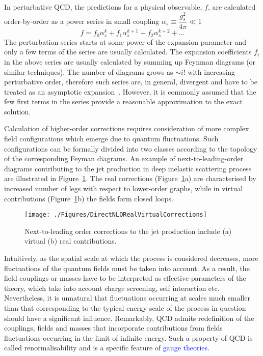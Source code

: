 In perturbative QCD, the predictions for a physical observable, $f$, are calculated order-by-order as a power series in small coupling $\alpha_s \equiv \dfrac{g_s^2}{4\pi} \ll 1$
\begin{equation}
   f=f_{0}\alpha^{k}_s + f_{1}\alpha^{k+1}_s + f_{2}\alpha^{k+2}_s + \ldots
	 \label{eq:pertseries}
\end{equation}
The perturbation series starts at some power of the expansion parameter and only a few terms of the series are usually calculated. The expansion coefficients $f_i$ in the above series are usually calculated by summing up Feynman diagrams (or similar techniques). The number of diagrams grows as $\sim i!$ with increasing perturbative order, therefore such series are, in general, divergent and have to be treated as an asymptotic expansion~\cite{lipatovQCD}. However, it is commonly assumed that the few first terms in the series provide a reasonable approximation to the exact solution.

Calculation of higher-order corrections requires consideration of more complex field configurations which emerge due to quantum fluctuations. Such configurations can be formally divided into two classes according to the topology of the corresponding Feyman diagrams. An example of next-to-leading-order diagrams contributing to the jet production in deep inelastic scattering process are illustrated in Figure~\ref{fig:nlojetfeyn}. The real corrections (Figure~\ref{fig:nlojetfeyn}a) are characterised by increased number of legs with respect to lower-order graphs, while in virtual contributions (Figure~\ref{fig:nlojetfeyn}b) the fields form closed loops.
 
\begin{figure}[h]
 \texttt{[image: ./Figures/DirectNLORealVirtualCorrections]}
\caption{Next-to-leading order corrections to the jet production include (a) virtual (b) real contributions.}
\label{fig:nlojetfeyn}
\end{figure}

Intuitively, as the spatial scale at which the process is considered decreases,  more fluctuations of the quantum fields must be taken into account. As a result, the field couplings or masses have to be interpreted as effective parameters of the theory, which take into account charge screening, self interaction etc. Nevertheless, it is unnatural that fluctuations occurring at scales much smaller than that corresponding to the typical energy scale of the process in question should have a significant influence. Remarkably, QCD admits redefinition of the couplings, fields and masses that incorporate contributions from fields fluctuations occurring in the limit of infinite energy. Such a property of QCD is called renormalisability and is a specific feature of \textcolor{blue}{gauge theories}. 

